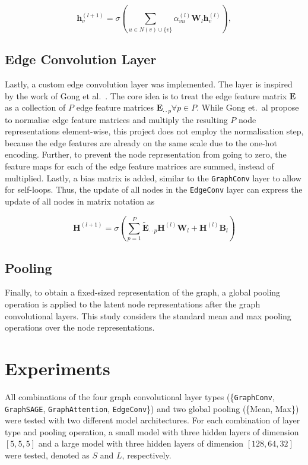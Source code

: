 \documentclass[10pt,conference,compsocconf]{IEEEtran}
\begin{document}
\begin{equation}
  \mathbf{h}_v^{(l+1)} = \sigma\left( \sum_{u\in N(v) \cup \{v\}}
  \alpha_{vu}^{(l)} \mathbf{W}_l\mathbf{h}_v^{(l)} \right),
\end{equation}

\subsection{Edge Convolution Layer}

Lastly, a custom edge convolution layer was implemented. The layer is inspired
by the work of Gong et al.~\cite{edgeconv}. The core idea is to treat the edge
feature matrix $\mathbf{E}$ as a collection of $P$ edge feature matrices
$\mathbf{E}_{\cdot\cdot p} \forall p \in P$. While Gong et.~al propose to
normalise edge feature matrices and multiply the resulting $P$ node
representations element-wise, this project does not employ the normalisation
step, because the edge features are already on the same scale due to the one-hot
encoding. Further, to prevent the node representation from going to zero, the
feature maps for each of the edge feature matrices are summed, instead of
multiplied. Lastly, a bias matrix is added, similar to the \texttt{GraphConv}
layer to allow for self-loops. Thus, the update of all nodes in the
\texttt{EdgeConv} layer can express the update of all nodes in matrix notation
as

\begin{equation}
  \mathbf{H}^{(l+1)} = 
  \sigma\left(
    \sum_{p=1}^P \tilde{\mathbf{E}}_{\cdot\cdot p} \mathbf{H}^{(l)} \mathbf{W}_l 
    +\mathbf{H}^{(l)} \mathbf{B}_l \right)
\end{equation}

\subsection{Pooling}

Finally, to obtain a fixed-sized representation of the graph, a global pooling
operation is applied to the latent node representations after the graph
convolutional layers. This study considers the standard mean and max pooling
operations over the node representations.

\section{Experiments}

All combinations of the four graph convolutional layer types
(\{\texttt{GraphConv}, \texttt{GraphSAGE}, \texttt{GraphAttention},
\texttt{EdgeConv}\}) and two global pooling (\{Mean, Max\}) were tested with two
different model architectures. For each combination of layer type and pooling
operation, a small model with three hidden layers of dimension $[5, 5, 5]$ and a
large model with three hidden layers of dimension $[128, 64, 32]$ were tested,
denoted as $S$ and $L$, respectively.
\end{document}
